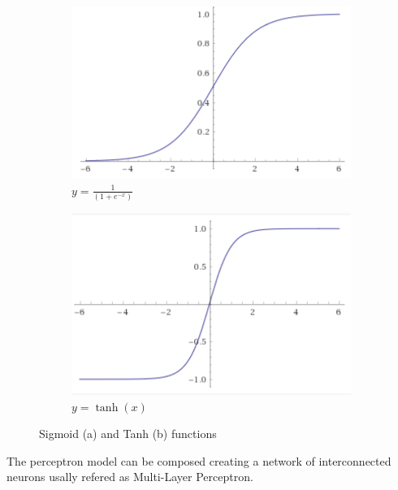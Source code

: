 \documentclass[../main.tex]{subfiles}
\begin{document}
\begin{figure}[h!]
    \centering
    \begin{subfigure}[]{0.4\textwidth}
        \includegraphics[width=\linewidth]{images/SigmoidFunction.png}
        \caption{$ {y = \frac{1}{(1+e^{-x})}} $}
        \label{fig:Sigmoid}
    \end{subfigure}
    \hspace{1cm}
    \begin{subfigure}[]{0.4\textwidth}
        \includegraphics[width=\linewidth]{images/TanhFunction.png}
        \caption{$ {y = \tanh(x)} $}
        \label{fig:Tanh}
    \end{subfigure}
    \caption{Sigmoid (a) and Tanh (b) functions}
    \label{fig:SigmoidTanh}
\end{figure}


The perceptron model can be composed creating a network of interconnected neurons usally refered as Multi-Layer Perceptron.
\end{document}
